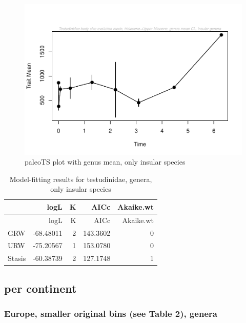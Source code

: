 \documentclass[]{article}
\begin{document}
\begin{figure}[htbp]
\centering
\includegraphics{MA_JJ_files/figure-latex/paleoTS plot with genus mean, excluding continental species-1.pdf}
\caption{paleoTS plot with genus mean, only insular species}
\end{figure}

\begin{longtable}[]{@{}lrrrr@{}}
\caption{Model-fitting results for testudinidae, genera, only insular
species}\tabularnewline
\toprule
& logL & K & AICc & Akaike.wt\tabularnewline
\midrule
\endfirsthead
\toprule
& logL & K & AICc & Akaike.wt\tabularnewline
\midrule
\endhead
GRW & -68.48011 & 2 & 143.3602 & 0\tabularnewline
URW & -75.20567 & 1 & 153.0780 & 0\tabularnewline
Stasis & -60.38739 & 2 & 127.1748 & 1\tabularnewline
\bottomrule
\end{longtable}

\newpage

\subsection{per continent}\label{per-continent}

\subsubsection{Europe, smaller original bins (see Table 2),
genera}\label{europe-smaller-original-bins-see-table-2-genera}
\end{document}
